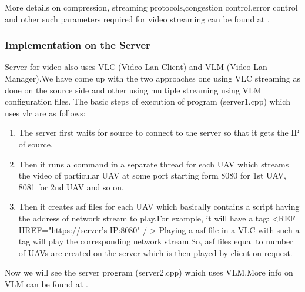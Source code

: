 \documentclass[12pt]{article}
\begin{document}
More details on compression, streaming protocols,congestion control,error control and other such parameters required for video streaming can be found at \cite{7}.
\subsubsection{Implementation on the Server}
Server for video also uses VLC (Video Lan Client) and VLM (Video Lan Manager).We have come up with the two approaches one using VLC streaming as done on the source side and other using multiple streaming using VLM configuration files.\newline
The basic steps of execution of program (server1.cpp) which uses vlc are as follows:\newline
\begin{enumerate}
\item The server first waits for source to connect to the server so that it gets the IP of source.
\item Then it runs a command in a separate thread for each UAV which streams the video of particular UAV at some port starting form 8080 for 1st UAV, 8081 for 2nd UAV and so on.
\item Then it creates asf files for each UAV which basically contains a script having the address of network stream to play.For example, it will have a tag:\newline 
 \textless REF HREF="https://server's IP:8080" / \textgreater \newline
Playing a asf file in a VLC with such a tag will play the corresponding network stream.\newline So, asf files equal to number of UAVs are created on the server which is then played by client on request.\newline
\end{enumerate}
Now we will see the server program (server2.cpp) which uses VLM.More info on VLM can be found at \cite{9}.\newline
\end{document}
